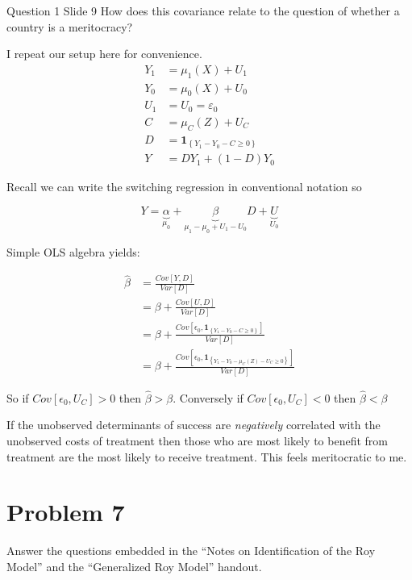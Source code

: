 \documentclass{article}
\begin{document}
\begin{problem}{Question 1 Slide 9} How does this covariance relate to the question of whether a country is a meritocracy?
\end{problem}
\begin{solution}

I repeat our setup here for convenience.
\begin{align*}
    Y_{1} &=\mu_{1}(X)+U_{1} \\ 
    Y_{0}&=\mu_{0}(X)+U_{0} \\
    U_{1}&=U_{0}=\varepsilon_{0} \\
    C &=\mu_{C}(Z)+U_{C} \\
    D&=\boldsymbol{1}_{\left\{Y_{1}-Y_{0}-C \geq 0\right\}} \\ 
    Y&=D Y_{1}+(1-D) Y_{0}
\end{align*}

Recall we can write the switching regression in conventional notation so 

$$
Y = \underbrace{\alpha}_{\mu_0} + \underbrace{\beta}_{\mu_1 - \mu_0 + U_1 - U_0} D + \underbrace{U}_{U_0}
$$

Simple OLS algebra yields:

\begin{align*}
\widehat{\beta} &= \frac{Cov[Y,D]}{Var[D]} \\
&= \beta + \frac{Cov[U,D]}{Var[D]} \\
&= \beta + \frac{Cov[\epsilon_0,\boldsymbol{1}_{\left\{Y_{1}-Y_{0}-C \geq 0\right\}}]}{Var[D]} \\
&= \beta + \frac{Cov[\epsilon_0,\boldsymbol{1}_{\left\{Y_{1}-Y_{0}-\mu_{C}(Z)-U_{C} \geq 0\right\}}]}{Var[D]}
\end{align*}

So if $Cov[\epsilon_0, U_C]>0$ then $\widehat{\beta} > \beta$. Conversely if $Cov[\epsilon_0, U_C]<0$ then $\widehat{\beta} < \beta$

If the unobserved determinants of success are \emph{negatively} correlated with the unobserved costs of treatment then those who are most likely to benefit from treatment are the most likely to receive treatment. This feels meritocratic to me.
\end{solution}


\newpage

\section*{Problem 7}
Answer the questions embedded in the ``Notes on Identification of the Roy Model'' and the ``Generalized Roy Model'' handout.
\end{document}
